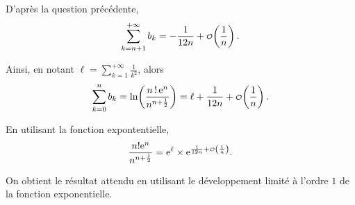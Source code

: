 \begin{elemdemo}
\begin{reponses}
\item D'après la question précédente,
\[
\sum_{k=n+1}^{+\infty} b_k = -\frac{1}{12 n} + \petito\mathopen{}\left(\frac{1}{n}\right).
\]

Ainsi, en notant $\ell = \sum\limits_{k=1}^{+\infty} \frac{1}{k^2}$, alors
\[
\sum_{k=0}^n b_k = \ln\mathopen{}\left(\frac{\fact{n} \, \e^n}{n^{n+\frac{1}{2}}}\right) = \ell + \frac{1}{12 n} + \petito\mathopen{}\left(\frac{1}{n}\right).
\]

En utilisant la fonction expontentielle,
\[
\frac{n! \e^n}{n^{n+\frac{1}{2}}} = \e^{\ell} \times \e^{\frac{1}{12 n} + \petito\mathopen{}\left(\frac{1}{n}\right)}.
\]

On obtient le résultat attendu en utilisant le développement limité à l'ordre $1$ de la fonction exponentielle.
\end{reponses}
\end{elemdemo}

